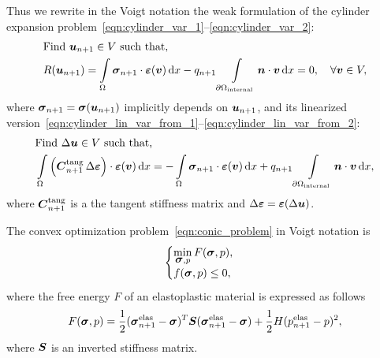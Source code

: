 \documentclass[12pt]{article}
\begin{document}
Thus we rewrite in the Voigt notation the weak formulation of the cylinder expansion problem~\eqref{eqn:cylinder_var_1}--\eqref{eqn:cylinder_var_2}:
\begin{align}
    & \text{Find } \mbox{\boldmath $u$}_{n+1} \in V \text{ such that,} \label{eqn:var_disc_from_1_voigt} \\ 
    & R(\mbox{\boldmath $u$}_{n+1}) = \int\limits_\Omega\mbox{\boldmath$\sigma$}_{n+1} \cdot \mbox{\boldmath $\varepsilon$}(\mbox{\boldmath $v$}) \, \mathrm{d} x - q_{n+1}\int\limits_{\partial\Omega_\text{internal}}\mbox{\boldmath $n$} \cdot \mbox{\boldmath $v$} \, \mathrm{d} x = 0, \quad \forall \mbox{\boldmath $v$} \in V \label{eqn:var_disc_from_2_voigt},
\end{align}
where $\mbox{\boldmath$\sigma$}_{n+1} = \mbox{\boldmath$\sigma$}(\mbox{\boldmath $u$}_{n+1})$ implicitly depends on $\mbox{\boldmath $u$}_{n+1}$, and its linearized version~\eqref{eqn:cylinder_lin_var_from_1}--\eqref{eqn:cylinder_lin_var_from_2}:
\begin{align}
    & \text{Find } \Delta\mbox{\boldmath $u$} \in V \text{ such that,} \label{eqn:cylinder_lin_var_1_voigt} \\ 
    & \int\limits_\Omega \left(\mbox{\boldmath $C$}_{n+1}^\text{tang} \, \Delta\mbox{\boldmath $\varepsilon$}\right) \cdot \mbox{\boldmath $\varepsilon$}(\mbox{\boldmath $v$}) \, \mathrm{d} x = -\int\limits_\Omega\mbox{\boldmath$\sigma$}_{n+1} \cdot \mbox{\boldmath $\varepsilon$}(\mbox{\boldmath $v$}) \, \mathrm{d} x + q_{n+1}\int\limits_{\partial\Omega_\text{internal}}\mbox{\boldmath $n$} \cdot \mbox{\boldmath $v$} \, \mathrm{d} x \label{eqn:cylinder_lin_var_2_voigt},
\end{align}
where $\mbox{\boldmath $C$}_{n+1}^{\text{tang}}$ is a the tangent stiffness matrix and $\Delta\mbox{\boldmath $\varepsilon$} = \mbox{\boldmath $\varepsilon$}(\Delta\mbox{\boldmath $u$})$.



The convex optimization problem~\eqref{eqn:conic_problem} in Voigt notation is
\begin{equation}
    \label{eqn:conic_problem_Voigt}
    \begin{cases}
        \min\limits_{\mbox{\boldmath$\sigma$}, p} F(\mbox{\boldmath$\sigma$}, p), \\
        f(\mbox{\boldmath$\sigma$}, p) \leq 0,
    \end{cases}
\end{equation}
where the free energy $F$ of an elastoplastic material is expressed as follows
\begin{equation}
    F(\mbox{\boldmath$\sigma$}, p) = \frac{1}{2}(\mbox{\boldmath$\sigma$}_{n+1}^\text{elas} - \mbox{\boldmath$\sigma$})^T \mbox{\boldmath $S$} (\mbox{\boldmath$\sigma$}_{n+1}^\text{elas} - \mbox{\boldmath$\sigma$}) + \frac{1}{2}H(p_{n+1}^\text{elas} - p)^2,
\end{equation}
where $\mbox{\boldmath $S$}$ is an inverted stiffness matrix.
\end{document}

